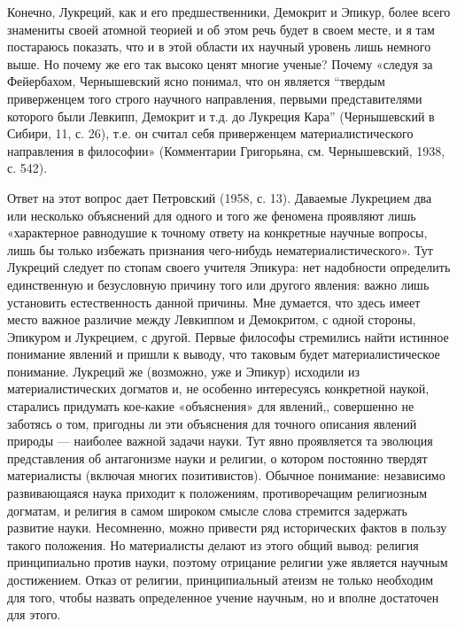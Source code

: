 Конечно, Лукреций, как и его предшественники, Демокрит и Эпикур, более
всего знамениты  своей атомной теорией  и об  этом речь будет  в своем
месте,  и  я  там  постараюсь  показать,  что  и  в  этой  области  их
научный  уровень  лишь немного  выше.  Но  почему  же его  так  высоко
ценят многие  ученые? Почему «следуя за  Фейербахом, Чернышевский ясно
понимал, что  он является ``твердым приверженцем  того строго научного
направления, первыми представителями которого были Левкипп, Демокрит и
т.д. до  Лукреция Кара'' (Чернышевский в  Сибири, 11, с. 26),  т.е. он
считал себя приверженцем  материалистического направления в философии»
(Комментарии Григорьяна, см. Чернышевский, 1938, с. 542).

Ответ  на  этот  вопрос  дает   Петровский  (1958,  с.  13).  Даваемые
Лукрецием два или  несколько объяснений для одного и  того же феномена
проявляют лишь «характерное равнодушие  к точному ответу на конкретные
научные  вопросы,  лишь  бы   только  избежать  признания  чего-нибудь
нематериалистического». Тут Лукреций следует  по стопам своего учителя
Эпикура: нет надобности определить  единственную и безусловную причину
того или другого явления:  важно лишь установить естественность данной
причины. Мне  думается, что  здесь имеет  место важное  различие между
Левкиппом  и Демокритом,  с  одной стороны,  Эпикуром  и Лукрецием,  с
другой. Первые философы стремились  найти истинное понимание явлений и
пришли  к  выводу,  что таковым  будет  материалистическое  понимание.
Лукреций же  (возможно, уже  и Эпикур) исходили  из материалистических
догматов  и,  не  особенно интересуясь  конкретной  наукой,  старались
придумать кое-какие «объяснения» для  явлений,, совершенно не заботясь
о том, пригодны ли эти объяснения для точного описания явлений природы
--- наиболее  важной задачи  науки. Тут  явно проявляется  та эволюция
представления  об антагонизме  науки  и религии,  о котором  постоянно
твердят материалисты (включая многих позитивистов). Обычное понимание:
независимо развивающаяся  наука приходит к  положениям, противоречащим
религиозным  догматам,   и  религия  в  самом   широком  смысле  слова
стремится  задержать развитие  науки. Несомненно,  можно привести  ряд
исторических фактов в пользу  такого положения. Но материалисты делают
из  этого общий  вывод:  религия принципиально  против науки,  поэтому
отрицание религии уже является  научным достижением. Отказ от религии,
принципиальный  атеизм не  только  необходим для  того, чтобы  назвать
определенное учение научным, но и вполне достаточен для этого.

